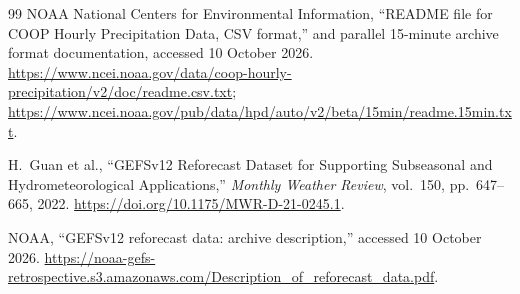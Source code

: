 \documentclass[12pt]{article}
\begin{document}
\begin{thebibliography}{99}
NOAA National Centers for Environmental Information,
``README file for COOP Hourly Precipitation Data, CSV format,''
and parallel 15-minute archive format documentation, accessed 10 October 2026.
\url{https://www.ncei.noaa.gov/data/coop-hourly-precipitation/v2/doc/readme.csv.txt};
\url{https://www.ncei.noaa.gov/pub/data/hpd/auto/v2/beta/15min/readme.15min.txt}.

H.~Guan et al., ``GEFSv12 Reforecast Dataset for Supporting Subseasonal
and Hydrometeorological Applications,'' \emph{Monthly Weather Review},
vol.~150, pp.~647--665, 2022.
\url{https://doi.org/10.1175/MWR-D-21-0245.1}.

NOAA, ``GEFSv12 reforecast data: archive description,'' accessed 10 October 2026.
\url{https://noaa-gefs-retrospective.s3.amazonaws.com/Description_of_reforecast_data.pdf}.
\end{thebibliography}
\end{document}
